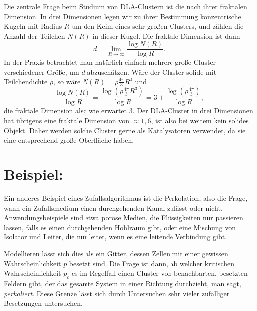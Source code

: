 Die zentrale Frage beim Studium von DLA-Clustern ist die nach ihrer
fraktalen Dimension. In drei Dimensionen legen wir zu ihrer Bestimmung
konzentrische Kugeln mit Radius $R$ um den Keim eines sehr großen
Clusters, und zählen die Anzahl der Teilchen $N(R)$ in dieser
Kugel. Die fraktale Dimension ist dann
\begin{equation}
  d = \lim_{R\to\infty}\frac{\log N(R)}{\log R}.
\end{equation}
In der Praxis betrachtet man natürlich einfach mehrere große Cluster
verschiedener Größe, um $d$ abzuschätzen.  Wäre der Cluster solide mit
Teilchendichte $\rho$, so wäre $N(R) = \rho \frac{4\pi}{3} R^3$ und
\begin{equation}
  \frac{\log N(R)}{\log R} = \frac{\log\left( \rho
      \frac{4\pi}{3} R^3\right)}{\log R} =
  3 + \frac{\log\left( \rho\frac{4\pi}{3}\right)}{\log R},
\end{equation}
die fraktale Dimension also wie erwartet 3. Der DLA-Cluster in drei
Dimensionen hat übrigens eine fraktale Dimension von $\approx 1,6$,
ist also bei weitem kein solides Objekt. Daher werden solche Cluster
gerne als Katalysatoren verwendet, da sie eine entsprechend große
Oberfläche haben.

\raggedbottom 

\section{Beispiel: }

Ein anderes Beispiel eines Zufallsalgorithmus ist die Perkolation,
also die Frage, wann ein Zufallsmedium einen durchgehenden Kanal
zulässt oder nicht. Anwendungsbeispiele sind etwa poröse Medien, die
Flüssigkeiten nur passieren lassen, falls es einen durchgehenden
Hohlraum gibt, oder eine Mischung von Isolator und Leiter, die nur
leitet, wenn es eine leitende Verbindung gibt.

Modellieren lässt sich dies als ein Gitter, dessen Zellen mit einer
gewissen Wahrscheinlichkeit $p$ besetzt sind. Die Frage ist dann, ab
welcher kritischen Wahrscheinlichkeit $p_c$ es im Regelfall einen
Cluster von benachbarten, besetzten Feldern gibt, der das gesamte
System in einer Richtung durchzieht, man sagt,
\emph{perkoliert}. Diese Grenze lässt sich durch Untersuchen sehr
vieler zufälliger Besetzungen untersuchen.

